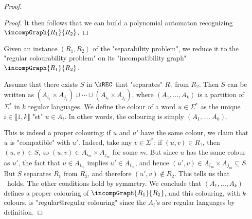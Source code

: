 \begin{proof}
\begin{proof}
    It then follows that we can build a polynomial automaton recognizing
    $\incompGraph{R_1}{R_2}$.
\end{proof}


    \AP Given an instance $(R_1,R_2)$ of the "separability problem", we
    reduce it to the "regular colourability problem" on its "incompatibility graph" $\incompGraph{R_1}{R_2}$.

   Assume that there exists $S$ in $\kREC$ that "separates" $R_1$ from $R_2$.
    Then $S$ can be written as $(A_{i_1}\times A_{j_1}) \cup \cdots \cup (A_{i_\ell}\times A_{j_\ell})$, 
    where $(A_1,\hdots,A_k)$ is a partition of $\Sigma^*$ in $k$ regular languages.
   We define the colour of a word $u \in \Sigma^*$ as the unique $i \in \lBrack 1,k \rBrack$
    "st" $u \in A_i$. In other words, the colouring is simply $(A_1,\hdots,A_k)$. 

    This is indeed a proper colouring: if $u$ and $u'$ have the same colour,
    we claim that $u$ is "compatible" with $u'$. Indeed, take any $v \in \Sigma^*$: if $(u,v) \in R_1$,
    then $(u,v) \in S$, so $(u,v) \in A_{i_m}\times A_{j_m}$ for some $m$. But since $u$ has the same colour 
    as $u'$, the fact that $u \in A_{i_m}$ implies $u' \in A_{i_m}$, and hence 
    $(u',v) \in A_{i_m}\times A_{j_m}\subseteq S$.
    But $S$ separates $R_1$ from $R_2$, and therefore $(u',v) \not\in R_2$. This tells us that \compL\ holds. 
    The other conditions hold by symmetry.
    We conclude that $(A_1,\hdots,A_k)$ defines
    a proper colouring of $\incompGraph{R_1}{R_2}$, and this colouring, with $k$ colours, is 
    "regular@regular colouring" since the $A_i$'s are regular languages by definition.


\end{proof}
